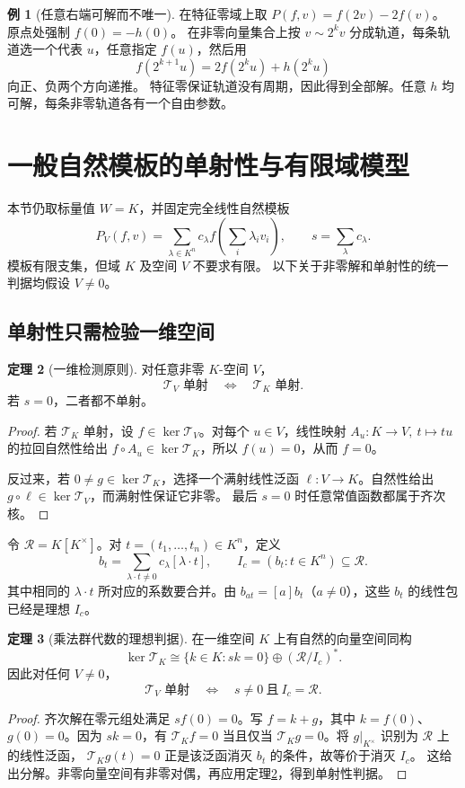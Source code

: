 \documentclass[UTF8,11pt,a4paper]{ctexart}
\theoremstyle{definition}
\newtheorem{theorem}{定理}[section]
\newtheorem{example}[theorem]{例}
\newcommand{\T}{\mathcal T}
\numberwithin{equation}{section}
\begin{document}
\begin{example}[任意右端可解而不唯一]
在特征零域上取 $P(f,v)=f(2v)-2f(v)$。
原点处强制 $f(0)=-h(0)$。
在非零向量集合上按 $v\sim2^k v$ 分成轨道，每条轨道选一个代表 $u$，任意指定 $f(u)$，然后用
\[
 f(2^{k+1}u)=2f(2^ku)+h(2^ku)
\]
向正、负两个方向递推。
特征零保证轨道没有周期，因此得到全部解。任意 $h$ 均可解，每条非零轨道各有一个自由参数。
\end{example}



\section{一般自然模板的单射性与有限域模型}\label{sec:generalideal}
本节仍取标量值 $W=K$，并固定完全线性自然模板
\[
 P_V(f,v)=\sum_{\lambda\in K^n}c_\lambda
 f\!\left(\sum_i\lambda_i v_i\right),\qquad
 s=\sum_\lambda c_\lambda.
\]
模板有限支集，但域 $K$ 及空间 $V$ 不要求有限。
以下关于非零解和单射性的统一判据均假设 $V\ne0$。

\subsection{单射性只需检验一维空间}
\begin{theorem}[一维检测原则]\label{thm:onedetect}
对任意非零 $K$-空间 $V$，
\[
 \T_V\text{ 单射}\quad\Longleftrightarrow\quad\T_K\text{ 单射}.
\]
若 $s=0$，二者都不单射。
\end{theorem}
\begin{proof}
若 $\T_K$ 单射，设 $f\in\ker\T_V$。对每个 $u\in V$，线性映射
$A_u:K\to V,\ t\mapsto tu$ 的拉回自然性给出
$f\circ A_u\in\ker\T_K$，所以 $f(u)=0$，从而 $f=0$。

反过来，若 $0\ne g\in\ker\T_K$，选择一个满射线性泛函
$\ell:V\to K$。自然性给出 $g\circ\ell\in\ker\T_V$，而满射性保证它非零。
最后 $s=0$ 时任意常值函数都属于齐次核。
\end{proof}

令 $\mathscr R=K[K^\times]$。对 $t=(t_1,\ldots,t_n)\in K^n$，定义
\[
 b_t=\sum_{\lambda\cdot t\ne0}c_\lambda[\lambda\cdot t],
 \qquad
 I_c=(b_t:t\in K^n)\subseteq\mathscr R.
\]
其中相同的 $\lambda\cdot t$ 所对应的系数要合并。由
$b_{at}=[a]b_t$（$a\ne0$），这些 $b_t$ 的线性包已经是理想 $I_c$。

\begin{theorem}[乘法群代数的理想判据]\label{thm:generalideal}
在一维空间 $K$ 上有自然的向量空间同构
\[
 \ker\T_K\cong \{k\in K:sk=0\}\oplus(\mathscr R/I_c)^*.
\]
因此对任何 $V\ne0$，
\begin{equation}\label{eq:generalinject}
 \T_V\text{ 单射}
 \quad\Longleftrightarrow\quad s\ne0\ \text{且}\ I_c=\mathscr R.
\end{equation}
\end{theorem}
\begin{proof}
齐次解在零元组处满足 $sf(0)=0$。写 $f=k+g$，其中
$k=f(0)$、$g(0)=0$。因为 $sk=0$，有 $\T_Kf=0$ 当且仅当
$\T_Kg=0$。将 $g|_{K^\times}$ 识别为 $\mathscr R$ 上的线性泛函，
$\T_Kg(t)=0$ 正是该泛函消灭 $b_t$ 的条件，故等价于消灭 $I_c$。
这给出分解。非零向量空间有非零对偶，再应用定理\ref{thm:onedetect}，得到单射性判据。
\end{proof}
\end{document}
